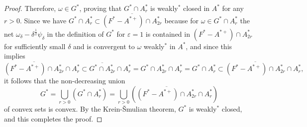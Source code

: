 \documentclass[noamsfonts,a4paper,10pt]{amsart}
\theoremstyle{plain}
\theoremstyle{definition}
\theoremstyle{remark}
\begin{document}
\begin{proof}
Therefore, $\omega\in G^*$, proving that $G^*\cap A_r^*$ is weakly$^*$ closed in $A^*$ for any $r>0$.
Since we have $G^*\cap A_r^*\subset\overline{(F^*-A^{*+})\cap A_{2r}^*}$ because for $\omega\in G^*\cap A_r^*$ the net $\omega_\delta-\delta^{\frac12}\psi_\delta$ in the definition of $G^*$ for $\varepsilon=1$ is contained in $(F^*-A^{*+})\cap A_{2r}^*$ for sufficiently small $\delta$ and is convergent to $\omega$ weakly$^*$ in $A^*$, and since this implies
\[\overline{(F^*-A^{*+})\cap A_{2r}^*}\cap A_r^*\subset\overline{G^*\cap A_{2r}^*}\cap A_r^*=G^*\cap A_{2r}^*\cap A_r^*=G^*\cap A_r^*\subset\overline{(F^*-A^{*+})\cap A_{2r}^*}\cap A_r^*,\]
it follows that the non-decreasing union
\[G^*=\bigcup_{r>0}(G^*\cap A_r^*)=\bigcup_{r>0}(\overline{(F^*-A^{*+})\cap A_{2r}^*}\cap A_r^*)\]
of convex sets is convex.
By the Krein-\v Smulian theorem, $G^*$ is weakly$^*$ closed, and this completes the proof.
\end{proof}
\end{document}
